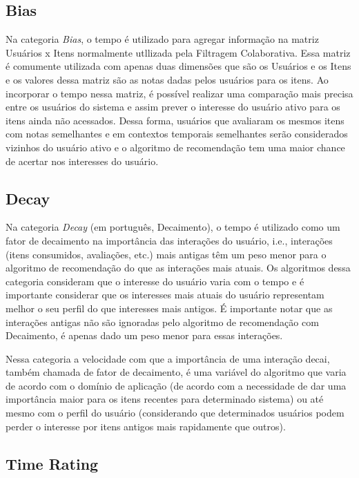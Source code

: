 \subsection{Bias}

Na categoria \textit{Bias}, o tempo é utilizado para agregar informação na matriz Usuários x Itens normalmente utllizada pela
Filtragem Colaborativa. Essa matriz é comumente utilizada com apenas duas dimensões que são os Usuários e os Itens e os
valores dessa matriz são as notas dadas pelos usuários para os itens. Ao incorporar o tempo nessa matriz, é possível
realizar uma comparação mais precisa entre os usuários do sistema e assim prever o interesse do usuário ativo para os
itens ainda não acessados. Dessa forma, usuários que avaliaram os mesmos itens com notas semelhantes e em contextos
temporais semelhantes serão considerados vizinhos do usuário ativo e o algoritmo de recomendação tem uma maior chance
de acertar nos interesses do usuário.

\subsection{Decay}\label{section:decay}

Na categoria \textit{Decay} (em português, Decaimento), o tempo é utilizado como um fator de decaimento na importância das interações do usuário, i.e.,
interações (itens consumidos, avaliações, etc.) mais antigas têm um peso menor para o algoritmo de recomendação do que
as interações mais atuais. Os algoritmos dessa categoria consideram que o interesse do usuário varia com o tempo e é
importante considerar que os interesses mais atuais do usuário representam melhor o seu perfil do que interesses mais
antigos. É importante notar que as interações antigas não são ignoradas pelo algoritmo de recomendação com Decaimento, é
apenas dado um peso menor para essas interações.

Nessa categoria a velocidade com que a importância de uma interação decai, também chamada de fator de decaimento,
é uma variável do algoritmo que varia de acordo com o domínio de aplicação (de acordo com a necessidade de dar uma importância
maior para os itens recentes para determinado sistema) ou até mesmo com o perfil do usuário (considerando que determinados
usuários podem perder o interesse por itens antigos mais rapidamente que outros).

\subsection{Time Rating}

